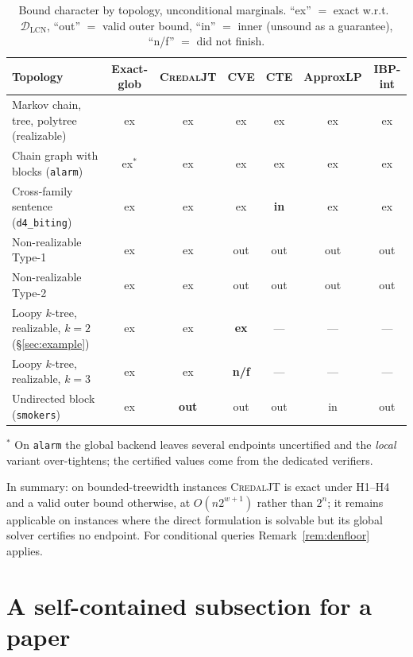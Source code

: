 \documentclass[11pt]{article}
\theoremstyle{definition}
\newcommand{\DLCN}{\mathcal{D}_{\mathrm{LCN}}}
\begin{document}
\begin{table}[ht]\centering\footnotesize
\caption{Bound character by topology, unconditional marginals. ``ex'' $=$ exact
w.r.t.\ $\DLCN$, ``out'' $=$ valid outer bound, ``in'' $=$ inner (unsound as a
guarantee), ``n/f'' $=$ did not finish.}\label{tab:topo}
\setlength{\tabcolsep}{4.5pt}
\begin{tabular}{@{}lcccccc@{}}
\toprule
Topology & Exact-glob & \textsc{CredalJT} & CVE & CTE & ApproxLP & IBP-int \\
\midrule
Markov chain, tree, polytree (realizable) & ex & ex & ex & ex & ex & ex \\
Chain graph with blocks (\texttt{alarm})  & ex$^\ast$ & ex & ex & ex & ex & ex \\
Cross-family sentence (\texttt{d4\_biting}) & ex & ex & ex & \textbf{in} & ex & ex \\
Non-realizable Type-1                     & ex & ex & out & out & out & out \\
Non-realizable Type-2                     & ex & ex & out & out & out & out \\
Loopy $k$-tree, realizable, $k{=}2$ (\S\ref{sec:example}) & ex & ex & \textbf{ex} & --- & --- & --- \\
Loopy $k$-tree, realizable, $k{=}3$       & ex & ex & \textbf{n/f} & --- & --- & --- \\
Undirected block (\texttt{smokers})       & ex & \textbf{out} & out & out & in & out \\
\bottomrule
\end{tabular}
\end{table}

\noindent$^\ast$ On \texttt{alarm} the global backend leaves several endpoints
uncertified and the \emph{local} variant over-tightens; the certified
values come from the dedicated verifiers.

In summary: on bounded-treewidth instances \textsc{CredalJT} is exact under
H1--H4 and a valid outer bound otherwise, at $O(n2^{w+1})$ rather than $2^n$; it
remains applicable on instances where the direct formulation is solvable but its
global solver certifies no endpoint. For conditional queries
Remark~\ref{rem:denfloor} applies.

\section{A self-contained subsection for a paper}\label{sec:paper}

\end{document}
